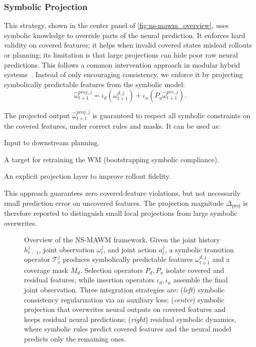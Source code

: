 \documentclass{article}
\theoremstyle{plain}
\theoremstyle{definition}
\theoremstyle{remark}
\begin{document}
\subsubsection{Symbolic Projection}
\label{sec:symbolic_projection}

This strategy, shown in the center panel of \autoref{fig:ns-mawm_overview}, uses symbolic knowledge to override parts of the neural prediction. It enforces hard validity on covered features; it helps when invalid covered states mislead rollouts or planning; its limitation is that large projections can hide poor raw neural predictions. This follows a common intervention approach in modular hybrid systems~\cite{garnelo2016deepsymbolicreinforcementlearning}. Instead of only encouraging consistency, we enforce it by projecting symbolically predictable features from the symbolic model:
\begin{equation}
  \hat{\omega}^{proj,j}_{t+1}
  =
  \iota_d(\omega^{d,j}_{t+1})
  + \iota_u(P_u\hat{\omega}^{pre,j}_{t+1}).
  \label{eq:symbolic_projection}
\end{equation}

The projected output $\hat{\omega}^{proj,j}_{t+1}$ is guaranteed to respect all symbolic constraints on the covered features, under correct rules and masks. It can be used as:
\begin{enumerate*}[label={\roman*) },itemjoin={; \quad}]
  \item Input to downstream planning.
  \item A target for retraining the WM (bootstrapping symbolic compliance).
  \item An explicit projection layer to improve rollout fidelity.
\end{enumerate*}

This approach guarantees zero covered-feature violations, but not necessarily small prediction error on uncovered features. The projection magnitude $\Delta_{\mathrm{proj}}$ is therefore reported to distinguish small local projections from large symbolic overwrites.

\begin{figure}[h!]
  \centering
  
  \caption{
  Overview of the NS-MAWM framework.
  Given the joint history $h^j_{t-1}$, joint observation $\omega^j_t$, and joint action $a^j_t$,
  a symbolic transition operator $\mathcal{T}^j_s$ produces symbolically predictable features $\omega^{d,j}_{t+1}$
  and a coverage mask $M_d$. Selection operators $P_d,P_u$ isolate covered and residual features, while insertion operators $\iota_d,\iota_u$ assemble the final joint observation.
  Three integration strategies are:
  (\emph{left}) symbolic consistency regularization via an auxiliary loss;
  (\emph{center}) symbolic projection that overwrites neural outputs on covered features and keeps residual neural predictions;
  (\emph{right}) residual symbolic dynamics, where symbolic rules predict covered features
  and the neural model predicts only the remaining ones.
  }
  \label{fig:ns-mawm_overview}
\end{figure}
\end{document}
